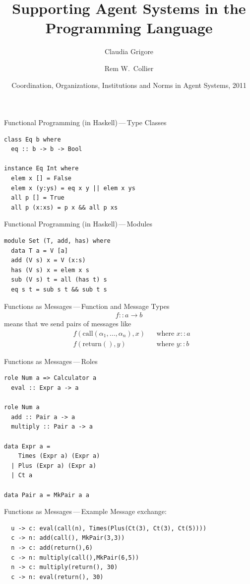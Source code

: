 \documentclass{beamer}
\title{Supporting Agent Systems in the Programming Language}
\author{Claudia Grigore \and Rem W.~Collier}
\institute{
  School of Computer Science\\
  University College Dublin\\
  IRCSET}
\date[COIN~2011]{Coordination, Organizations, Institutions and Norms
  in Agent Systems, 2011}
\begin{document}
\begin{frame}
  \titlepage
\end{frame}

\begin{frame}[fragile]{Functional Programming (in Haskell)\,---\,Type Classes}

\begin{lstlisting}
class Eq b where
  eq :: b -> b -> Bool

instance Eq Int where
  elem x [] = False
  elem x (y:ys) = eq x y || elem x ys
  all p [] = True
  all p (x:xs) = p x && all p xs
\end{lstlisting}
\end{frame}

\begin{frame}[fragile]{Functional Programming (in Haskell)\,---\,Modules}
\begin{lstlisting}
module Set (T, add, has) where
  data T a = V [a]
  add (V s) x = V (x:s)
  has (V s) x = elem x s
  sub (V s) t = all (has t) s
  eq s t = sub s t && sub t s
\end{lstlisting}
\end{frame}

\begin{frame}[fragile]{Functions as Messages\,---\,Function and Message Types}
\begin{align*}
f :: a \to b
\end{align*}
means that we send pairs of messages like
\begin{align*}
&f(\mathrm{call}(\alpha_1,\ldots,\alpha_n), x) &&\text{where $x::a$}\\
&f(\mathrm{return}(),y) &&\text{where $y::b$}
\end{align*}
\end{frame}

\begin{frame}[fragile]{Functions as Messages\,---\,Roles}
\begin{lstlisting}
role Num a => Calculator a
  eval :: Expr a -> a

role Num a
  add :: Pair a -> a
  multiply :: Pair a -> a

data Expr a =
    Times (Expr a) (Expr a)
  | Plus (Expr a) (Expr a)
  | Ct a

data Pair a = MkPair a a
\end{lstlisting}
\end{frame}

\begin{frame}[fragile]{Functions as Messages\,---\,Example}
Message exchange:
\begin{lstlisting}
  u -> c: eval(call(n), Times(Plus(Ct(3), Ct(3), Ct(5))))
  c -> n: add(call(), MkPair(3,3))
  n -> c: add(return(),6)
  c -> n: multiply(call(),MkPair(6,5))
  n -> c: multiply(return(), 30)
  c -> n: eval(return(), 30)
\end{lstlisting}
\end{frame}
\end{document}
